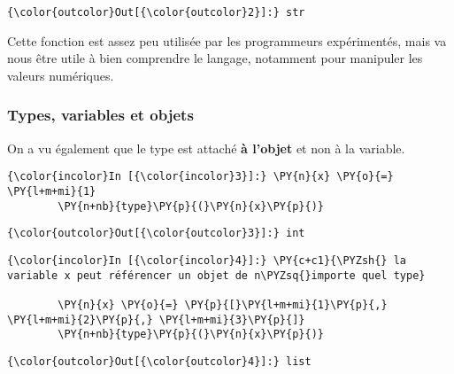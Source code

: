 \begin{Verbatim}[commandchars=\\\{\},frame=single,framerule=0.3mm,rulecolor=\color{cellframecolor}]
{\color{outcolor}Out[{\color{outcolor}2}]:} str
\end{Verbatim}
            
    Cette fonction est assez peu utilisée par les programmeurs expérimentés,
mais va nous être utile à bien comprendre le langage, notamment pour
manipuler les valeurs numériques.

    \hypertarget{types-variables-et-objets}{%
\subsubsection{Types, variables et
objets}\label{types-variables-et-objets}}

    On a vu également que le type est attaché \textbf{à l'objet} et non à la
variable.

    \begin{Verbatim}[commandchars=\\\{\},frame=single,framerule=0.3mm,rulecolor=\color{cellframecolor}]
{\color{incolor}In [{\color{incolor}3}]:} \PY{n}{x} \PY{o}{=} \PY{l+m+mi}{1}
        \PY{n+nb}{type}\PY{p}{(}\PY{n}{x}\PY{p}{)}
\end{Verbatim}


\begin{Verbatim}[commandchars=\\\{\},frame=single,framerule=0.3mm,rulecolor=\color{cellframecolor}]
{\color{outcolor}Out[{\color{outcolor}3}]:} int
\end{Verbatim}
            
    \begin{Verbatim}[commandchars=\\\{\},frame=single,framerule=0.3mm,rulecolor=\color{cellframecolor}]
{\color{incolor}In [{\color{incolor}4}]:} \PY{c+c1}{\PYZsh{} la variable x peut référencer un objet de n\PYZsq{}importe quel type}
        
        \PY{n}{x} \PY{o}{=} \PY{p}{[}\PY{l+m+mi}{1}\PY{p}{,} \PY{l+m+mi}{2}\PY{p}{,} \PY{l+m+mi}{3}\PY{p}{]}
        \PY{n+nb}{type}\PY{p}{(}\PY{n}{x}\PY{p}{)}
\end{Verbatim}


\begin{Verbatim}[commandchars=\\\{\},frame=single,framerule=0.3mm,rulecolor=\color{cellframecolor}]
{\color{outcolor}Out[{\color{outcolor}4}]:} list
\end{Verbatim}
            
